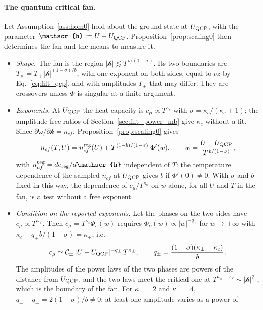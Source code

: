 \documentclass[10pt,a4paper]{article}
\theoremstyle{plain}
\newcommand{\hfield}{\mathscr{h}}  %
\begin{document}
\paragraph{The quantum critical fan.} Let Assumption~\ref{ass:hom0} hold
about the ground state at $U_{\rm QCP}$, with the parameter
$\hfield:=U-U_{\rm QCP}$. Proposition~\ref{prop:scaling0} then determines
the fan and the means to measure it.
\begin{itemize}\setlength{\itemsep}{2pt}
\item \emph{Shape.} The fan is the region
  $|\hfield|\lesssim T^{\,b/(1-\sigma)}$. Its two boundaries are
  $T_\times=T_\pm\,|\hfield|^{(1-\sigma)/b}$, with one exponent on both
  sides, equal to $\nu z$ by Eq.~\eqref{eq:filt_qcp}, and with amplitudes
  $T_\pm$ that may differ. They are crossovers unless $\Phi$ is singular at a
  finite argument.
\item \emph{Exponents.} At $U_{\rm QCP}$ the heat capacity is
  $c_\mu\propto T^{\kappa_c}$ with $\sigma=\kappa_c/(\kappa_c+1)$; the
  amplitude-free ratios of Section~\ref{sec:filt_power_mb} give $\kappa_c$
  without a fit. Since $\partial\omega/\partial\hfield=n_{cf}$,
  Proposition~\ref{prop:scaling0} gives
  \[
    n_{cf}(T,U)=n_{cf}^{\rm reg}(U)+T^{(1-b)/(1-\sigma)}\,\Phi'(w) ,
    \qquad w=\frac{U-U_{\rm QCP}}{T^{\,b/(1-\sigma)}} ,
  \]
  with $n_{cf}^{\rm reg}=de_{\rm reg}/d\hfield$ independent of $T$: the
  temperature dependence of the sampled $n_{cf}$ at $U_{\rm QCP}$ gives $b$
  if $\Phi'(0)\neq0$. With $\sigma$ and $b$ fixed in this way, the
  dependence of $c_\mu/T^{\kappa_c}$ on $w$ alone, for all $U$ and $T$ in the
  fan, is a test without a free exponent.
\item \emph{Condition on the reported exponents.} Let the phases on the two
  sides have $c_\mu\propto T^{\kappa_\pm}$. Then
  $c_\mu=T^{\kappa_c}\Phi_c(w)$ requires
  $\Phi_c(w)\propto|w|^{-q_\pm}$ for $w\to\pm\infty$ with
  $\kappa_c+q_\pm b/(1-\sigma)=\kappa_\pm$, i.e.
  \begin{equation}\label{eq:fkm_amp}
    c_\mu\simeq\mathcal C_\pm\,|U-U_{\rm QCP}|^{-q_\pm}\,T^{\kappa_\pm} ,
    \qquad
    q_\pm=\frac{(1-\sigma)(\kappa_\pm-\kappa_c)}{b} .
  \end{equation}
  The amplitudes of the power laws of the two phases are powers of the
  distance from $U_{\rm QCP}$, and the two laws meet the critical one at
  $T^{\kappa_\pm-\kappa_c}\sim|\hfield|^{q_\pm}$, which is the boundary of the
  fan. For $\kappa_-=2$ and $\kappa_+=4$,
  $q_+-q_-=2(1-\sigma)/b\neq0$: at least one amplitude varies as a power of

\end{itemize}
\end{document}
